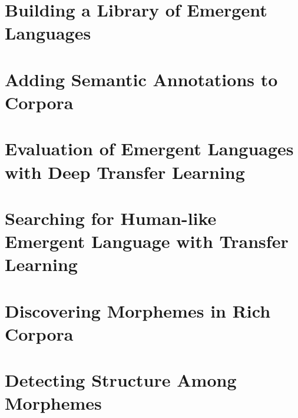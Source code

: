 






\newpage
\thispagestyle{plain}




\newpage
\tableofcontents*



\chapter{Building a Library of Emergent Languages }
\unskip\label{ch:elcc}



\chapter{Adding Semantic Annotations to Corpora }
\unskip\label{ch:rich-corpora}



\chapter{Evaluation of Emergent Languages with Deep Transfer Learning}
\unskip\label{ch:xferbench}


\chapter{Searching for Human-like Emergent Language with Transfer Learning }
\unskip\label{ch:hpo}



\chapter{Discovering Morphemes in Rich Corpora }
\unskip\label{ch:morphemes}



\chapter{Detecting Structure Among Morphemes }
\unskip\label{ch:syntax}




